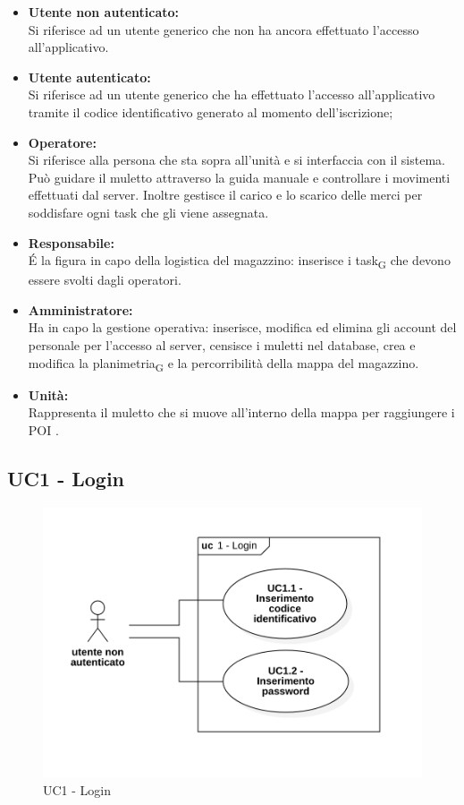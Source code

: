 \begin{itemize}
	\item{\textbf{Utente non autenticato:}\\
	Si riferisce ad un utente generico che non ha ancora effettuato l'accesso all'applicativo.}
	\item{\textbf{Utente autenticato:}\\
	Si riferisce ad un utente generico che ha effettuato l'accesso all'applicativo tramite il codice identificativo generato al momento dell'iscrizione;}
	\item{\textbf{Operatore:}\\
	Si riferisce alla persona che sta sopra all'unità e si interfaccia con il sistema. Può guidare il muletto attraverso la guida manuale e controllare i movimenti effettuati dal server. Inoltre gestisce il carico e lo scarico delle merci per soddisfare ogni task che gli viene assegnata.}
	\item{\textbf{Responsabile:}\\
	 \'E la figura in capo della logistica del magazzino: inserisce i task\textsubscript{G} che devono essere svolti dagli operatori.}
	\item{\textbf{Amministratore:}\\
 Ha in capo la gestione operativa: inserisce, modifica ed elimina gli account del personale per l'accesso al server, censisce i muletti nel database, crea e modifica la planimetria\textsubscript{G} e la percorribilità della mappa del magazzino.}
	\item {\textbf{Unità:}\\
	Rappresenta il muletto che si muove all'interno della mappa per raggiungere i POI . }
\end{itemize}

\subsection{UC1 - Login}
\begin{figure}[H]
	\centering
	\includegraphics[scale=0.6]{res/images/uc1.PNG}
	\caption{UC1 - Login}
\end{figure}


